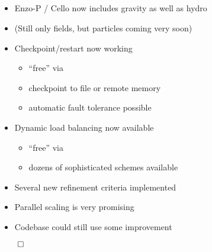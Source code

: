 \NEWSEC

\subsection{\ssPresentSummary}


\begin{frame}[fragile,label=ss-present-summary] 
\secframetitle{\ssPresentSummary}
\begin{itemize}
\item Enzo-P / Cello now includes gravity as well as hydro
\item (Still only fields, but particles coming very soon)
\item Checkpoint/restart now working
\begin{itemize}
\item ``free'' via \charm
\item checkpoint to file or remote memory
\item automatic fault tolerance possible
\end{itemize}
\item Dynamic load balancing now available
\begin{itemize}
\item ``free'' via \charm
\item dozens of sophisticated schemes available
\end{itemize}
\item Several new refinement criteria implemented
\item Parallel scaling is very promising
\item Codebase could still use some improvement
\end{itemize}
\vfill
\centerline{$\qed$}
\end{frame}

